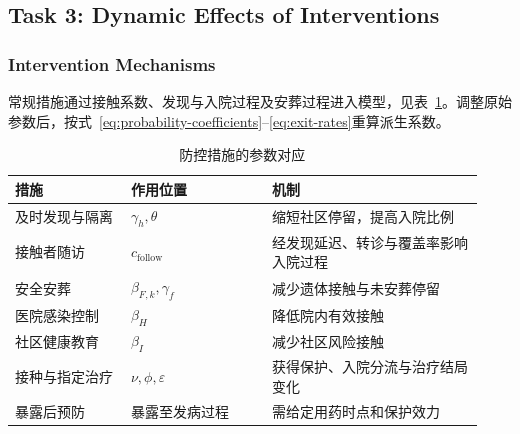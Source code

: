 \subsection{Task 3: Dynamic Effects of Interventions}
\label{sec:task-3}

\subsubsection{Intervention Mechanisms}

常规措施通过接触系数、发现与入院过程及安葬过程进入模型，见表~\ref{tab:control-mechanisms}。调整原始参数后，按式~\eqref{eq:probability-coefficients}--\eqref{eq:exit-rates}重算派生系数。

\begin{table}[!htbp]
\centering
\caption{防控措施的参数对应}
\label{tab:control-mechanisms}
\small
\begin{tabular}{@{}p{0.23\linewidth}p{0.28\linewidth}p{0.42\linewidth}@{}}
\toprule
措施 & 作用位置 & 机制 \\
\midrule
及时发现与隔离 & $\gamma_h,\theta$ & 缩短社区停留，提高入院比例 \\
接触者随访 & $c_{\mathrm{follow}}$ & 经发现延迟、转诊与覆盖率影响入院过程 \\
安全安葬 & $\beta_{F,k},\gamma_f$ & 减少遗体接触与未安葬停留 \\
医院感染控制 & $\beta_H$ & 降低院内有效接触 \\
社区健康教育 & $\beta_I$ & 减少社区风险接触 \\
接种与指定治疗 & $\nu,\phi,\varepsilon$ & 获得保护、入院分流与治疗结局变化 \\
暴露后预防 & 暴露至发病过程 & 需给定用药时点和保护效力 \\
\bottomrule
\end{tabular}
\end{table}

